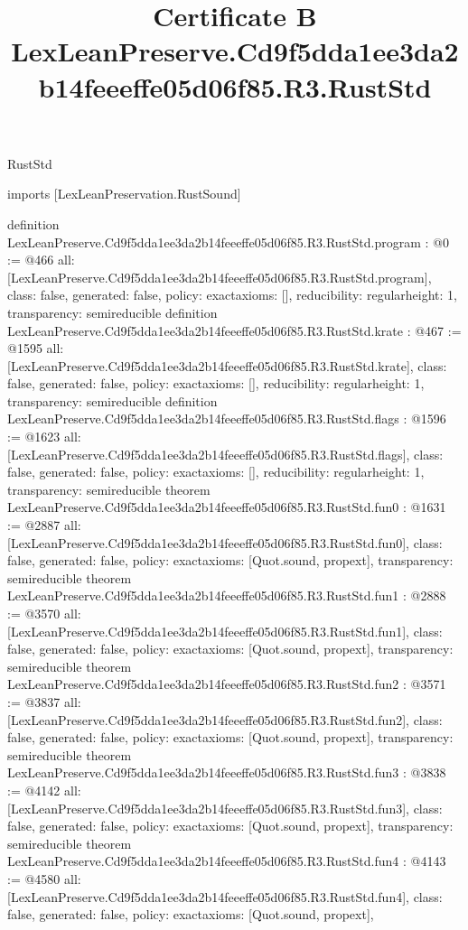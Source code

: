 \begin{lexlean}{RustStd}
\title{Certificate B LexLeanPreserve.Cd9f5dda1ee3da2b14feeeffe05d06f85.R3.RustStd}
\begin{coremodule}
imports [LexLeanPreservation.RustSound]

definition LexLeanPreserve.Cd9f5dda1ee3da2b14feeeffe05d06f85.R3.RustStd.program : @0 := @466 {
  all: [LexLeanPreserve.Cd9f5dda1ee3da2b14feeeffe05d06f85.R3.RustStd.program],
  class: false,
  generated: false,
  policy: exact{axioms: []},
  reducibility: regular{height: 1},
  transparency: semireducible
}
definition LexLeanPreserve.Cd9f5dda1ee3da2b14feeeffe05d06f85.R3.RustStd.krate : @467 := @1595 {
  all: [LexLeanPreserve.Cd9f5dda1ee3da2b14feeeffe05d06f85.R3.RustStd.krate],
  class: false,
  generated: false,
  policy: exact{axioms: []},
  reducibility: regular{height: 1},
  transparency: semireducible
}
definition LexLeanPreserve.Cd9f5dda1ee3da2b14feeeffe05d06f85.R3.RustStd.flags : @1596 := @1623 {
  all: [LexLeanPreserve.Cd9f5dda1ee3da2b14feeeffe05d06f85.R3.RustStd.flags],
  class: false,
  generated: false,
  policy: exact{axioms: []},
  reducibility: regular{height: 1},
  transparency: semireducible
}
theorem LexLeanPreserve.Cd9f5dda1ee3da2b14feeeffe05d06f85.R3.RustStd.fun0 : @1631 := @2887 {
  all: [LexLeanPreserve.Cd9f5dda1ee3da2b14feeeffe05d06f85.R3.RustStd.fun0],
  class: false,
  generated: false,
  policy: exact{axioms: [Quot.sound, propext]},
  transparency: semireducible
}
theorem LexLeanPreserve.Cd9f5dda1ee3da2b14feeeffe05d06f85.R3.RustStd.fun1 : @2888 := @3570 {
  all: [LexLeanPreserve.Cd9f5dda1ee3da2b14feeeffe05d06f85.R3.RustStd.fun1],
  class: false,
  generated: false,
  policy: exact{axioms: [Quot.sound, propext]},
  transparency: semireducible
}
theorem LexLeanPreserve.Cd9f5dda1ee3da2b14feeeffe05d06f85.R3.RustStd.fun2 : @3571 := @3837 {
  all: [LexLeanPreserve.Cd9f5dda1ee3da2b14feeeffe05d06f85.R3.RustStd.fun2],
  class: false,
  generated: false,
  policy: exact{axioms: [Quot.sound, propext]},
  transparency: semireducible
}
theorem LexLeanPreserve.Cd9f5dda1ee3da2b14feeeffe05d06f85.R3.RustStd.fun3 : @3838 := @4142 {
  all: [LexLeanPreserve.Cd9f5dda1ee3da2b14feeeffe05d06f85.R3.RustStd.fun3],
  class: false,
  generated: false,
  policy: exact{axioms: [Quot.sound, propext]},
  transparency: semireducible
}
theorem LexLeanPreserve.Cd9f5dda1ee3da2b14feeeffe05d06f85.R3.RustStd.fun4 : @4143 := @4580 {
  all: [LexLeanPreserve.Cd9f5dda1ee3da2b14feeeffe05d06f85.R3.RustStd.fun4],
  class: false,
  generated: false,
  policy: exact{axioms: [Quot.sound, propext]},
}
\end{coremodule}
\end{lexlean}

